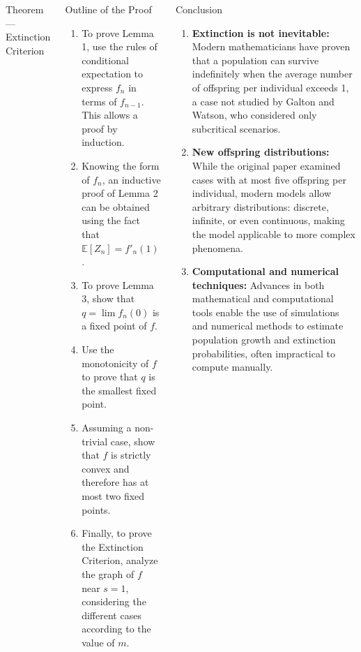 \documentclass[palette=none,mode=dark]{impaTeXPoster}
\begin{document}
\begin{columns}
\begin{postercard}{Theorem — Extinction Criterion}
\end{postercard}

\begin{postercard}{Outline of the Proof}

\begin{enumerate}
    \item To prove Lemma 1, use the rules of conditional expectation to express \(f_n\) in terms of \(f_{n-1}\). This allows a proof by induction.
    \item Knowing the form of \(f_n\), an inductive proof of Lemma 2 can be obtained using the fact that \(\mathbb{E}[Z_n] = f'_n(1)\).
    \item To prove Lemma 3, show that \(q = \lim f_n(0)\) is a fixed point of \(f\).
    \item Use the monotonicity of \(f\) to prove that \(q\) is the smallest fixed point.
    \item Assuming a non-trivial case, show that \(f\) is strictly convex and therefore has at most two fixed points.
    \item Finally, to prove the Extinction Criterion, analyze the graph of \(f\) near \(s = 1\), considering the different cases according to the value of \(m\).
\end{enumerate}

\end{postercard}


\begin{postercard}{Conclusion}

\begin{enumerate}
    \item \textbf{Extinction is not inevitable:} Modern mathematicians have proven that a population can survive indefinitely when the average number of offspring per individual exceeds 1, a case not studied by Galton and Watson, who considered only subcritical scenarios.

    \item \textbf{New offspring distributions:} While the original paper examined cases with at most five offspring per individual, modern models allow arbitrary distributions: discrete, infinite, or even continuous, making the model applicable to more complex phenomena.

    \item \textbf{Computational and numerical techniques:} Advances in both mathematical and computational tools enable the use of simulations and numerical methods to estimate population growth and extinction probabilities, often impractical to compute manually.
\end{enumerate}

\end{postercard}

\end{columns}
\end{document}
